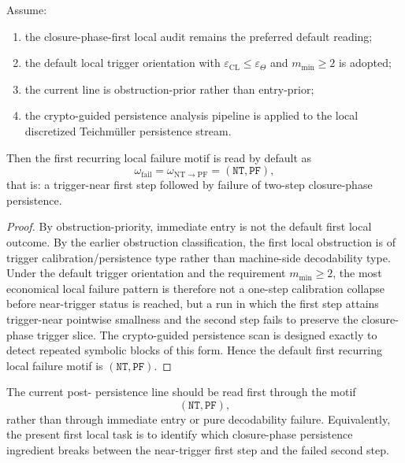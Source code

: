 \begin{theorem}
\label{thm:first-recurring-local-persistence-failure-reading}
Assume:
\begin{enumerate}
 \item the closure-phase-first local audit remains the preferred default reading;
 \item the default local trigger orientation with \(\varepsilon_{\mathrm{CL}}\le \varepsilon_{\Theta}\) and \(m_{\min}\ge 2\) is adopted;
 \item the current line is obstruction-prior rather than entry-prior;
 \item the crypto-guided persistence analysis pipeline is applied to the local discretized Teichm\"uller persistence stream.
\end{enumerate}
Then the first recurring local failure motif is read by default as
\[
\omega_{\mathrm{fail}}
=
\omega_{\mathrm{NT\to PF}}
=
(\mathtt{NT},\mathtt{PF}),
\]
that is: a trigger-near first step followed by failure of two-step closure-phase persistence.
\end{theorem}

\begin{proof}
By obstruction-priority, immediate entry is not the default first local outcome.
By the earlier obstruction classification, the first local obstruction is of trigger calibration/persistence type rather than machine-side decodability type.
Under the default trigger orientation and the requirement \(m_{\min}\ge 2\), the most economical local failure pattern is therefore not a one-step calibration collapse before near-trigger status is reached, but a run in which the first step attains trigger-near pointwise smallness and the second step fails to preserve the closure-phase trigger slice.
The crypto-guided persistence scan is designed exactly to detect repeated symbolic blocks of this form.
Hence the default first recurring local failure motif is \((\mathtt{NT},\mathtt{PF})\).
\end{proof}

\begin{corollary}
\label{cor:current-first-persistence-stream-reading}
The current post- persistence line should be read first through the motif
\[
(\mathtt{NT},\mathtt{PF}),
\]
rather than through immediate entry or pure decodability failure.
Equivalently, the present first local task is to identify which closure-phase persistence ingredient breaks between the near-trigger first step and the failed second step.
\end{corollary}

